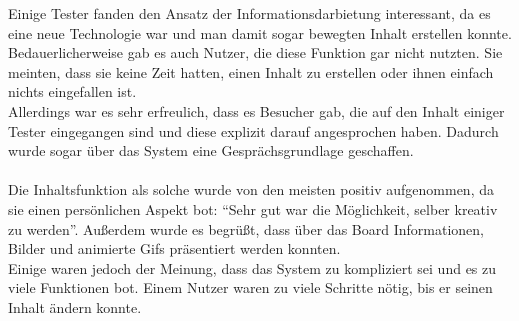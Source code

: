 Einige Tester fanden den Ansatz der Informationsdarbietung interessant, da es eine neue Technologie war und man damit sogar bewegten Inhalt erstellen konnte.
\\
Bedauerlicherweise gab es auch Nutzer, die diese Funktion gar nicht nutzten.
Sie meinten, dass sie keine Zeit hatten, einen Inhalt zu erstellen oder ihnen einfach nichts eingefallen ist.
\\
Allerdings war es sehr erfreulich, dass es Besucher gab, die auf den Inhalt einiger Tester eingegangen sind und diese explizit darauf angesprochen haben.
Dadurch wurde sogar über das System eine Gesprächsgrundlage geschaffen.
\\
\\
Die Inhaltsfunktion als solche wurde von den meisten positiv aufgenommen, da sie einen persönlichen Aspekt bot: ``Sehr gut war die Möglichkeit, selber kreativ zu werden''.
Außerdem wurde es begrüßt, dass über das Board Informationen, Bilder und animierte Gifs präsentiert werden konnten.
\\
Einige waren jedoch der Meinung, dass das System zu kompliziert sei und es zu viele Funktionen bot.
Einem Nutzer waren zu viele Schritte nötig, bis er seinen Inhalt ändern konnte.




